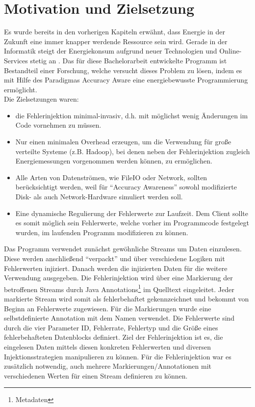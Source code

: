 \section{Motivation und Zielsetzung}

Es wurde bereits in den vorherigen Kapiteln erwähnt, dass Energie in der Zukunft eine immer knapper werdende Ressource sein wird. Gerade in der Informatik steigt der Energiekonsum aufgrund neuer Technologien und Online-Services stetig an \cite{Kommey}. Das f\"ur diese Bachelorarbeit entwickelte Programm ist Bestandteil einer Forschung, welche versucht dieses Problem zu l\"osen, indem es mit Hilfe des Paradigmas Accuracy Aware eine energiebewusste Programmierung erm\"oglicht. \\
Die Zielsetzungen waren:
\begin{itemize}
	\item die Fehlerinjektion minimal-invasiv, d.h. mit möglichst wenig Änderungen im Code vornehmen zu müssen.   
	\item Nur einen minimalen Overhead erzeugen, um die Verwendung für große verteilte Systeme (z.B. Hadoop), bei denen neben der Fehlerinjektion zugleich Energiemessungen vorgenommen werden können, zu ermöglichen.
	\item Alle Arten von Datenströmen, wie FileIO oder Network, sollten berücksichtigt werden, weil für ``Accuracy Awareness'' sowohl modifizierte Disk- als auch Network-Hardware simuliert werden soll.
	\item Eine dynamische Regulierung der Fehlerwerte zur Laufzeit. Dem Client sollte es somit m\"oglich sein Fehlerwerte, welche vorher im Programmcode festgelegt wurden, im laufenden Programm modifizieren zu k\"onnen.
\end{itemize}

Das Programm verwendet zun\"achst gew\"ohnliche Streams um Daten einzulesen. Diese werden anschlie\ss end ``verpackt'' und \"uber verschiedene Logiken mit Fehlerwerten injiziert. Danach werden die injizierten Daten für die weitere Verwendung ausgegeben. Die Fehlerinjektion wird über eine Markierung der betroffenen Streams durch Java Annotations\footnote{Metadaten} im Quelltext eingeleitet. Jeder markierte Stream wird somit als fehlerbehaftet gekennzeichnet und bekommt von Beginn an Fehlerwerte zugewiesen. Für die Markierungen wurde eine selbstdefinierte Annotation mit dem Namen  verwendet. Die Fehlerwerte sind durch die vier Parameter ID, Fehlerrate, Fehlertyp und die Gr\"o\ss e eines fehlerbehafteten Datenblocks definiert. Ziel der Fehlerinjektion ist es, die eingelesen Daten mittels diesen konkreten Fehlerwerten und diversen Injektionsstrategien manipulieren zu k\"onnen. F\"ur die Fehlerinjektion war es zusätzlich notwendig, auch mehrere Markierungen/Annotationen mit verschiedenen Werten f\"ur einen Stream definieren zu k\"onnen. 
